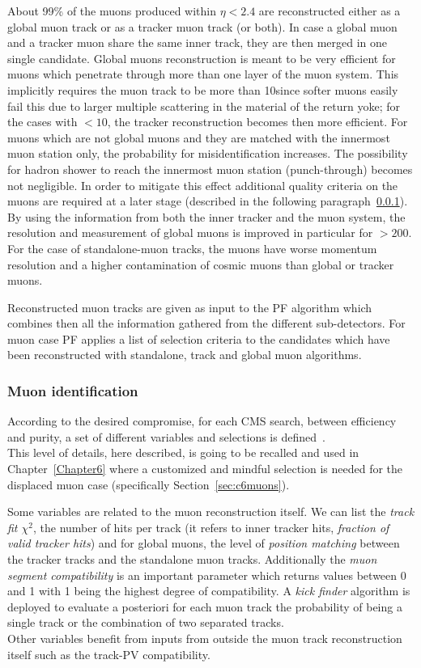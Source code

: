 About 99\% of the muons produced within $\eta < 2.4$ are reconstructed
either as a global muon track or as a tracker muon track (or
both). In case a global muon and a tracker muon share the same inner
track, they are then merged in one single candidate.
Global muons reconstruction is meant to be very efficient for muons
which penetrate
through more than one layer of the muon system. This implicitly
requires the muon track to be more than 10\GeV since softer muons
easily fail this due to larger multiple scattering in the material of the return yoke; for the cases with
\pt$< 10$\GeV, the tracker reconstruction becomes then more efficient.
For muons which are not global muons and
they are matched with the innermost muon station only,
the probability for misidentification increases. The possibility for
hadron shower to reach the innermost muon station (punch-through)
becomes not negligible. In order to mitigate this effect additional
quality criteria on the muons are required at a later stage (described
in the following paragraph~\ref{sec:c2muonselection}).
By using the information from both the
inner tracker and the muon
system, the \pt resolution and measurement of global muons is improved
in particular for \pt $> 200$\GeV. For the case of standalone-muon
tracks, the muons have worse momentum resolution and a higher
contamination of cosmic muons than global or tracker muons.

Reconstructed muon tracks are given as input to the PF algorithm which
combines then all the information gathered from the different
sub-detectors. For muon case PF applies a list of selection criteria
to the candidates which have been reconstructed with standalone, track
and global muon algorithms. 

\subsubsection{Muon identification}\label{sec:c2muonselection}
According to the desired compromise, for each CMS search, between efficiency and purity, a
set of different variables and selections is defined~\cite{Sirunyan_2018_muon}.\\
This level of details, here described, is going to be recalled and
used in Chapter~\ref{Chapter6} where a customized and mindful selection is needed
for the displaced muon case (specifically Section~\ref{sec:c6muons}).

Some variables are related to the muon reconstruction itself. We can
list the \emph{track fit $\chi^2$}, the number of hits per track (it refers
to inner tracker hits, \emph{fraction of valid tracker hits}) and for global muons, the
level of \emph{position matching} between the tracker tracks and the standalone muon
tracks. Additionally the \emph{muon segment
compatibility} is an important parameter which returns values between 0
and 1 with 1 being the highest degree of compatibility. A \emph{kick
  finder} algorithm is deployed to evaluate a posteriori for each muon
track the
probability of being a single track or the combination of two
separated tracks.  \\
Other variables benefit from inputs from outside the muon track
reconstruction itself such as the track-PV compatibility.

